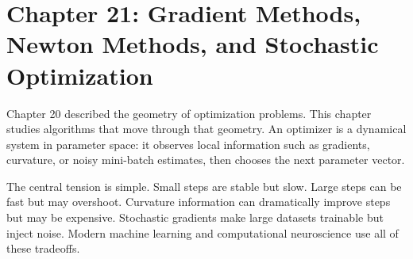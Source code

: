 \section{Chapter 21: Gradient Methods, Newton Methods, and Stochastic Optimization}
\label{ch:gradient-newton-stochastic-optimization}

Chapter 20 described the geometry of optimization problems. This chapter studies algorithms that move through that geometry. An optimizer is a dynamical system in parameter space: it observes local information such as gradients, curvature, or noisy mini-batch estimates, then chooses the next parameter vector.

The central tension is simple. Small steps are stable but slow. Large steps can be fast but may overshoot. Curvature information can dramatically improve steps but may be expensive. Stochastic gradients make large datasets trainable but inject noise. Modern machine learning and computational neuroscience use all of these tradeoffs.

